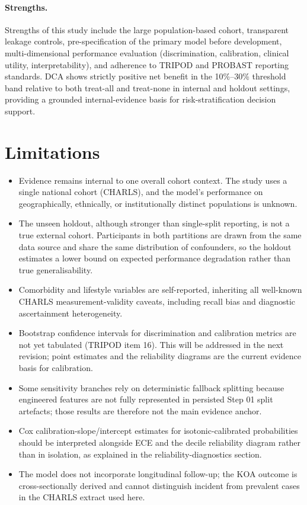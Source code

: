 \documentclass[11pt,a4paper]{article}
\begin{document}
\paragraph{Strengths.} Strengths of this study include the large population-based cohort, transparent leakage controls, pre-specification of the primary model before development, multi-dimensional performance evaluation (discrimination, calibration, clinical utility, interpretability), and adherence to TRIPOD and PROBAST reporting standards. DCA shows strictly positive net benefit in the 10\%--30\% threshold band relative to both treat-all and treat-none in internal and holdout settings, providing a grounded internal-evidence basis for risk-stratification decision support.

\section{Limitations}
\begin{itemize}
\item Evidence remains internal to one overall cohort context. The study uses a single national cohort (CHARLS), and the model's performance on geographically, ethnically, or institutionally distinct populations is unknown.
\item The unseen holdout, although stronger than single-split reporting, is not a true external cohort. Participants in both partitions are drawn from the same data source and share the same distribution of confounders, so the holdout estimates a lower bound on expected performance degradation rather than true generalisability.
\item Comorbidity and lifestyle variables are self-reported, inheriting all well-known CHARLS measurement-validity caveats, including recall bias and diagnostic ascertainment heterogeneity.
\item Bootstrap confidence intervals for discrimination and calibration metrics are not yet tabulated (TRIPOD item 16). This will be addressed in the next revision; point estimates and the reliability diagrams are the current evidence basis for calibration.
\item Some sensitivity branches rely on deterministic fallback splitting because engineered features are not fully represented in persisted Step 01 split artefacts; those results are therefore not the main evidence anchor.
\item Cox calibration-slope/intercept estimates for isotonic-calibrated probabilities should be interpreted alongside ECE and the decile reliability diagram rather than in isolation, as explained in the reliability-diagnostics section.
\item The model does not incorporate longitudinal follow-up; the KOA outcome is cross-sectionally derived and cannot distinguish incident from prevalent cases in the CHARLS extract used here.
\end{itemize}
\end{document}
